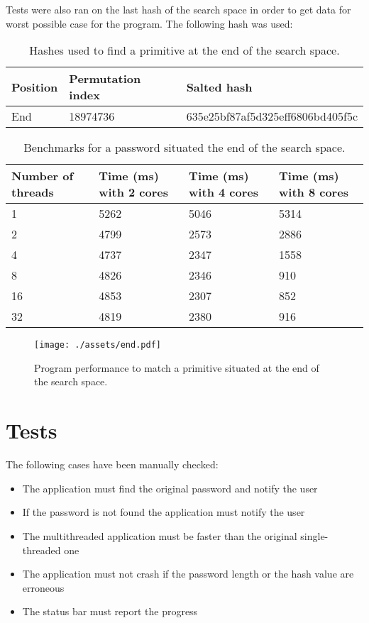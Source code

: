 \documentclass{article}
\begin{document}
Tests were also ran on the last hash of the search space in order to get data for worst possible case for the program.
The following hash was used:

\begin{table}[!ht]
    \centering
    \begin{tabular}{|l|l|l|}
    \hline
        Position & Permutation index & Salted hash \\ \hline
        End & 18974736 & 635e25bf87af5d325eff6806bd405f5c \\ \hline
    \end{tabular}
    \caption{Hashes used to find a primitive at the end of the search space.}
\end{table}

\begin{table}[!ht]
    \centering
    \begin{tabular}{|l|l|l|l|}
    \hline
        Number of threads & Time (ms) with 2 cores & Time (ms) with 4 cores & Time (ms) with 8 cores \\ \hline
        1 & 5262 & 5046 & 5314 \\ \hline
        2 & 4799 & 2573 & 2886 \\ \hline
        4 & 4737 & 2347 & 1558 \\ \hline
        8 & 4826 & 2346 & 910 \\ \hline
        16 & 4853 & 2307 & 852 \\ \hline
        32 & 4819 & 2380 & 916 \\ \hline
    \end{tabular}
    \caption{Benchmarks for a password situated the end of the search space.}
\end{table}

\begin{figure}[!htb]
    \centering
    \texttt{[image: ./assets/end.pdf]}
    \caption{Program performance to match a primitive situated at the end of the search space.}
\end{figure}

\section{Tests}

The following cases have been manually checked:

\begin{itemize}
    \item The application must find the original password and notify the user
    \item If the password is not found the application must notify the user
    \item The multithreaded application must be faster than the original single-threaded one
    \item The application must not crash if the password length or the hash value are erroneous
    \item The status bar must report the progress
\end{itemize}
\end{document}
